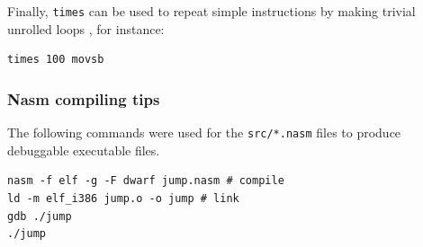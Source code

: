 \documentclass[a4paper]{article}
\begin{document}
Finally, \texttt{times} can be used to repeat simple instructions by making trivial unrolled loops \cite{nasmdoc}, for instance:

\begin{verbatim}
times 100 movsb
\end{verbatim}


\subsubsection{Nasm compiling tips}
\label{app:nasm_tips}

The following commands were used for the \texttt{src/*.nasm} files to produce debuggable executable files.
\begin{verbatim}
nasm -f elf -g -F dwarf jump.nasm # compile
ld -m elf_i386 jump.o -o jump # link
gdb ./jump
./jump
\end{verbatim}



\newpage
\printbibliography
\end{document}
